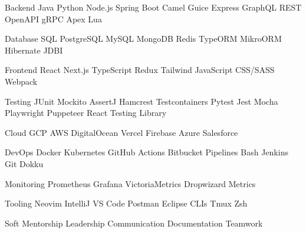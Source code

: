 

\begin{cvskills}

  \cvskill
    {Backend} %
    {Java \cpshalf Python \cpshalf Node.js \cpshalf Spring Boot \cpshalf Camel \cpshalf Guice \cpshalf Express \cpshalf GraphQL \cpshalf REST \cpshalf OpenAPI \cpshalf gRPC \cpshalf Apex \cpshalf Lua } %

  \cvskill
    {Database} %
    {SQL \cpshalf PostgreSQL \cpshalf MySQL \cpshalf MongoDB \cpshalf Redis \cpshalf TypeORM \cpshalf MikroORM \cpshalf Hibernate \cpshalf JDBI} %

  \cvskill
    {Frontend} %
    {React \cpshalf Next.js \cpshalf TypeScript \cpshalf Redux \cpshalf Tailwind \cpshalf JavaScript \cpshalf CSS/SASS \cpshalf Webpack} %

  \cvskill
    {Testing} %
    {JUnit \cpshalf Mockito \cpshalf AssertJ \cpshalf Hamcrest \cpshalf Testcontainers \cpshalf Pytest \cpshalf Jest \cpshalf Mocha \cpshalf Playwright \cpshalf Puppeteer \cpshalf React Testing Library} %

  \cvskill
    {Cloud} %
    {GCP \cpshalf AWS \cpshalf DigitalOcean \cpshalf Vercel \cpshalf Firebase \cpshalf Azure \cpshalf Salesforce} %

  \cvskill
    {DevOps} %
    {Docker \cpshalf Kubernetes \cpshalf GitHub Actions \cpshalf Bitbucket Pipelines \cpshalf Bash \cpshalf Jenkins \cpshalf Git \cpshalf Dokku} %


  \cvskill
  {Monitoring} %
    {Prometheus \cpshalf Grafana \cpshalf VictoriaMetrics \cpshalf Dropwizard Metrics} %

  \cvskill
  {Tooling} %
    {Neovim \cpshalf IntelliJ \cpshalf VS Code \cpshalf Postman \cpshalf Eclipse \cpshalf CLIs \cpshalf Tmux \cpshalf Zsh} %

  \cvskill
  {Soft} %
    {Mentorship \cpshalf Leadership \cpshalf Communication \cpshalf Documentation \cpshalf Teamwork} %

\end{cvskills}
